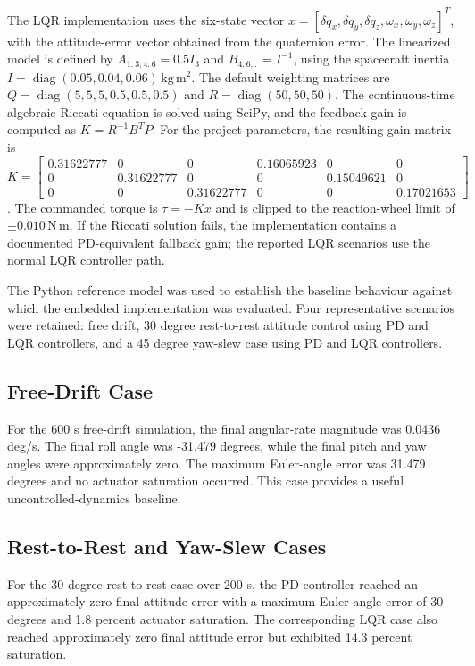 \documentclass[11pt,a4paper]{article}
\begin{document}
The LQR implementation uses the six-state vector $x=[\delta q_x,\delta q_y,\delta q_z,\omega_x,\omega_y,\omega_z]^T$, with the attitude-error vector obtained from the quaternion error. The linearized model is defined by $A_{1:3,4:6}=0.5I_3$ and $B_{4:6,:}=I^{-1}$, using the spacecraft inertia $I=\operatorname{diag}(0.05,0.04,0.06)\,\mathrm{kg\,m^2}$. The default weighting matrices are $Q=\operatorname{diag}(5,5,5,0.5,0.5,0.5)$ and $R=\operatorname{diag}(50,50,50)$. The continuous-time algebraic Riccati equation is solved using SciPy, and the feedback gain is computed as $K=R^{-1}B^TP$. For the project parameters, the resulting gain matrix is $K=\begin{bmatrix}0.31622777&0&0&0.16065923&0&0\\0&0.31622777&0&0&0.15049621&0\\0&0&0.31622777&0&0&0.17021653\end{bmatrix}$. The commanded torque is $\tau=-Kx$ and is clipped to the reaction-wheel limit of $\pm0.010\,\mathrm{N\,m}$. If the Riccati solution fails, the implementation contains a documented PD-equivalent fallback gain; the reported LQR scenarios use the normal LQR controller path.

The Python reference model was used to establish the baseline behaviour against which the embedded implementation was evaluated. Four representative scenarios were retained: free drift, 30 degree rest-to-rest attitude control using PD and LQR controllers, and a 45 degree yaw-slew case using PD and LQR controllers.

\subsection{Free-Drift Case}

For the 600 s free-drift simulation, the final angular-rate magnitude was 0.0436 deg/s. The final roll angle was -31.479 degrees, while the final pitch and yaw angles were approximately zero. The maximum Euler-angle error was 31.479 degrees and no actuator saturation occurred. This case provides a useful uncontrolled-dynamics baseline.

\subsection{Rest-to-Rest and Yaw-Slew Cases}

For the 30 degree rest-to-rest case over 200 s, the PD controller reached an approximately zero final attitude error with a maximum Euler-angle error of 30 degrees and 1.8 percent actuator saturation. The corresponding LQR case also reached approximately zero final attitude error but exhibited 14.3 percent saturation.
\end{document}
